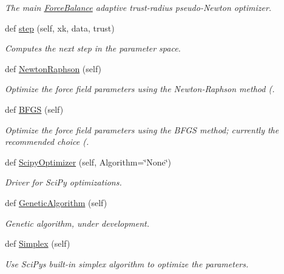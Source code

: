\begin{DoxyCompactItemize}
\begin{DoxyCompactList}\small\item\em The main \hyperlink{namespaceForceBalance}{Force\+Balance} adaptive trust-\/radius pseudo-\/\+Newton optimizer. \end{DoxyCompactList}\item 
def \hyperlink{classsrc_1_1optimizer_1_1Optimizer_ad8a296a7a624707234b4c9fc949c5dbd}{step} (self, xk, data, trust)
\begin{DoxyCompactList}\small\item\em Computes the next step in the parameter space. \end{DoxyCompactList}\item 
def \hyperlink{classsrc_1_1optimizer_1_1Optimizer_aee3a09f71220a784ef9541ce54270711}{Newton\+Raphson} (self)
\begin{DoxyCompactList}\small\item\em Optimize the force field parameters using the Newton-\/\+Raphson method (. \end{DoxyCompactList}\item 
def \hyperlink{classsrc_1_1optimizer_1_1Optimizer_a8cdd2f557dca05f63ffd1893916fd4ca}{B\+F\+GS} (self)
\begin{DoxyCompactList}\small\item\em Optimize the force field parameters using the B\+F\+GS method; currently the recommended choice (. \end{DoxyCompactList}\item 
def \hyperlink{classsrc_1_1optimizer_1_1Optimizer_a1e616a4c920b3e8935ca19e208b1c3be}{Scipy\+Optimizer} (self, Algorithm=\char`\"{}None\char`\"{})
\begin{DoxyCompactList}\small\item\em Driver for Sci\+Py optimizations. \end{DoxyCompactList}\item 
def \hyperlink{classsrc_1_1optimizer_1_1Optimizer_a3948891ba042abccf4c6e111f3ce50be}{Genetic\+Algorithm} (self)
\begin{DoxyCompactList}\small\item\em Genetic algorithm, under development. \end{DoxyCompactList}\item 
def \hyperlink{classsrc_1_1optimizer_1_1Optimizer_a1265cbe1250d67e385e9ed5ca9c946ea}{Simplex} (self)
\begin{DoxyCompactList}\small\item\em Use Sci\+Py\textquotesingle{}s built-\/in simplex algorithm to optimize the parameters. \end{DoxyCompactList}\item 

\end{DoxyCompactItemize}
